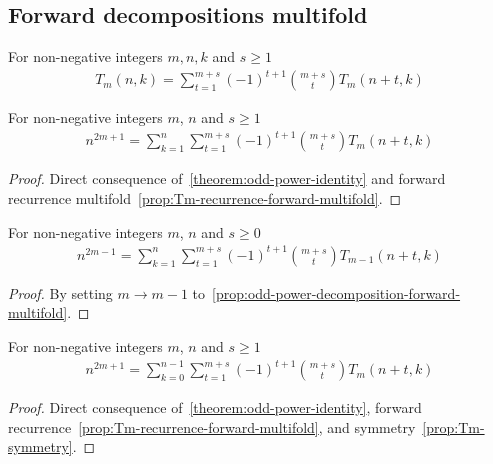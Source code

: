 \subsection{Forward decompositions multifold}
\label{subsec:forward-decompositions-multifold}
\begin{proposition}
    For non-negative integers $m,n,k$ and $s \geq 1$
    \label{prop:Tm-recurrence-forward-multifold}
    \begin{align*}
        T_{m} (n,k) = \sum_{t=1}^{m+s} (-1)^{t+1} \binom{m+s}{t} T_{m} (n+t, k)
    \end{align*}
\end{proposition}

\begin{proposition}
    \label{prop:odd-power-decomposition-forward-multifold}
    For non-negative integers $m$, $n$ and $s \geq 1$
    \begin{align*}
        n^{2m+1} = \sum_{k=1}^{n} \sum_{t=1}^{m+s} (-1)^{t+1} \binom{m+s}{t} T_{m} (n+t, k)
    \end{align*}
    \begin{proof}
        Direct consequence of~\eqref{theorem:odd-power-identity}
        and forward recurrence multifold~\eqref{prop:Tm-recurrence-forward-multifold}.
    \end{proof}
\end{proposition}

\begin{proposition}
    \label{prop:odd-power-decomposition-forward-m-1-multifold}
    For non-negative integers $m$, $n$ and $s\geq 0$
    \begin{align*}
        n^{2m-1} = \sum_{k=1}^{n} \sum_{t=1}^{m+s} (-1)^{t+1} \binom{m+s}{t} T_{m-1} (n+t, k)
    \end{align*}
    \begin{proof}
        By setting $m \rightarrow m-1$ to~\eqref{prop:odd-power-decomposition-forward-multifold}.
    \end{proof}
\end{proposition}

\begin{proposition}
    \label{prop:odd-power-decomposition-forward-shifted-multifold}
    For non-negative integers $m$, $n$ and $s\geq 1$
    \begin{align*}
        n^{2m+1} = \sum_{k=0}^{n-1} \sum_{t=1}^{m+s} (-1)^{t+1} \binom{m+s}{t} T_{m} (n+t, k)
    \end{align*}
    \begin{proof}
        Direct consequence of~\eqref{theorem:odd-power-identity},
        forward recurrence~\eqref{prop:Tm-recurrence-forward-multifold}, and symmetry~\eqref{prop:Tm-symmetry}.
    \end{proof}
\end{proposition}

